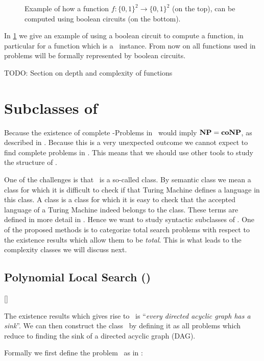 \begin{figure}
    \centering
    \caption[Computing a function with circuits]{Example of how a function $f : \{0, 1\}^2 \rightarrow \{0, 1\}^2$ (on the top), can be computed using boolean circuits (on the bottom).}
    \label{fig:computing_function_example}
\end{figure}

In \cref{fig:computing_function_example} we give an example of using a boolean circuit to compute a function, in particular for a function which is a \Tarski\ instance. From now on all functions used in problems will be formally represented by boolean circuits.

TODO: Section on depth and complexity of functions

\section{Subclasses of \TFNP}

Because the existence of complete \FNP-Problems in \TFNP\, would imply $\textbf{NP} = \textbf{coNP}$, as described in .
Because this is a very unexpected outcome we cannot expect to find complete problems in \TFNP{}.
This means that we should use other tools to study the structure of \TFNP{}. \par
One of the challenges is that \TFNP\ is a so-called  class.
By semantic class we mean a class for which it is difficult to check if that Turing Machine defines a language in this class.
A  class is a class for which it is easy to check that the accepted language of a Turing Machine indeed belongs to the class.
These terms are defined in more detail in .
Hence we want to study syntactic subclasses of \TFNP.
One of the proposed methods  is to categorize total search problems with respect to the existence results which allow
them to be \textit{total}. This is what leads to the complexity classes we will discuss next.

\subsection{Polynomial Local Search (\PLS)}[\PLS]

The existence results which gives rise to \PLS\ is ``\textit{every directed acyclic graph has a sink}''.
We can then construct the class \PLS\ by defining it as all problems which reduce to finding the sink of a directed acyclic graph (DAG). \par
Formally we first define the problem \Localopt\ as in :

